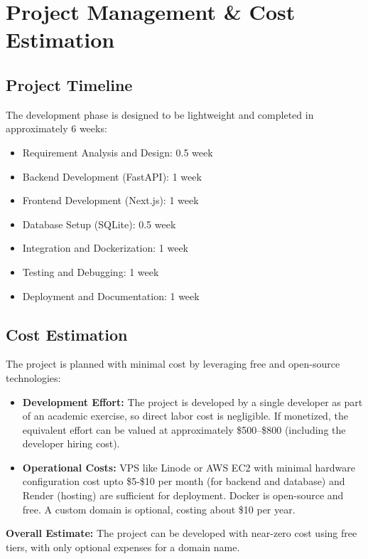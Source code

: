 \section{Project Management \& Cost Estimation}

\subsection*{Project Timeline}
The development phase is designed to be lightweight and completed in approximately 6 weeks:

\begin{itemize}
    \item Requirement Analysis and Design: 0.5 week
    \item Backend Development (FastAPI): 1 week
    \item Frontend Development (Next.js): 1 week
    \item Database Setup (SQLite): 0.5 week
    \item Integration and Dockerization: 1 week
    \item Testing and Debugging: 1 week
    \item Deployment and Documentation: 1 week
\end{itemize}



\subsection*{Cost Estimation}
The project is planned with minimal cost by leveraging free and open-source technologies:
\begin{itemize}
    \item \textbf{Development Effort:} The project is developed by a single developer
      as part of an academic exercise, so direct labor cost is negligible.
      If monetized, the equivalent effort can be valued at approximately \$500--\$800 (including the developer hiring cost).
    \item \textbf{Operational Costs:} VPS like Linode or AWS EC2 with minimal hardware configuration
      cost upto \$5-\$10 per month (for backend and database)  and
      Render (hosting) are sufficient for deployment.
      Docker is open-source and free. A custom domain is optional, costing about \$10 per year.
\end{itemize}

\noindent
\textbf{Overall Estimate:} The project can be developed with near-zero cost using free tiers,
with only optional expenses for a domain name.
